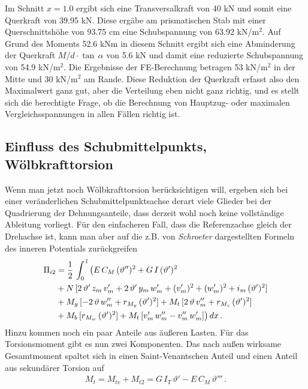 Im Schnitt $x=1.0$ ergibt sich eine Transversalkraft von 40 kN und somit eine Querkraft von 39.95 kN. Diese erg\"{a}be am prismatischen Stab mit einer Querschnittsh\"{o}he von 93.75 cm eine Schubspannung von 63.92 kN/m$^2$. Auf Grund des Moments 52.6 kNm in diesem Schnitt ergibt sich eine Abminderung der Querkraft $M/d \cdot\tan\,\alpha$ von 5.6 kN und damit eine reduzierte Schubspannung von 54.9 kN/m$^2$. Die Ergebnisse der FE-Berechnung betragen 53 kN/m$^2$ in der Mitte und 30 kN/m$^2$ am Rande. Diese Reduktion der Querkraft erfasst also den Maximalwert ganz gut, aber die Verteilung eben nicht ganz richtig, und es stellt sich die berechtigte Frage, ob die Berechnung von Hauptzug- oder maximalen Vergleichsspannungen in allen F\"{a}llen richtig ist.
{\textcolor{sectionTitleBlue}{\subsection{Einfluss des Schubmittelpunkts, W\"{o}lbkrafttorsion}}}
Wenn man jetzt noch W\"{o}lbkrafttorsion ber\"{u}cksichtigen will, ergeben sich bei einer ver\"{a}nderlichen Schubmittelpunktsachse derart viele Glieder bei der Quadrierung der Dehnungsanteile, dass derzeit wohl noch keine vollst\"{a}ndige Ableitung vorliegt. F\"{u}r den einfacheren Fall, dass die Referenzachse gleich der Drehachse ist, kann man aber auf die z.B. von {\em Schroeter\/} \cite{Schroeter2} dargestellten Formeln des inneren Potentials zur\"{u}ckgreifen
\begin{align}
\Pi_{i2} &= \frac{1}{2}\,\int_0^{\,l} \big(E\,C_M \,(\vartheta'')^2 + G\,I\,(\vartheta')^2 \nonumber\\
&+ N\,[ 2\,\vartheta'\,z_m\,v_m' + 2\,\vartheta'\,y_m\,w_m' + (v_m')^2 + (w_m')^2 +
i_m\,(\vartheta')^2] \nonumber\\
&+ M_y\,[- 2\,\vartheta\,w_m'' + r_{M_y}\,(\vartheta')^2] + M_t\,[2\,\vartheta\,v_m''
+ r_{M_z}\,(\vartheta')^2] \nonumber\\
&+ M_b\,[r_{M_w}\,(\vartheta')^2] + M_t\,[v_m'\,w_m'' - v_m''\,w_m']
 \big)\,dx\,.
\end{align}
Hinzu kommen noch ein paar Anteile aus \"{a}u{\ss}eren Lasten. F\"{u}r das Torsionsmoment gibt es nun zwei Komponenten. Das nach au{\ss}en wirksame Gesamtmoment spaltet sich in einen Saint-Venantschen Anteil und einen Anteil aus sekund\"{a}rer Torsion auf
\begin{align}
M_t = M_{tv} + M_{t2} = G\,I_T\,\vartheta' - E\,C_M\,\vartheta'''\,.
\end{align}
